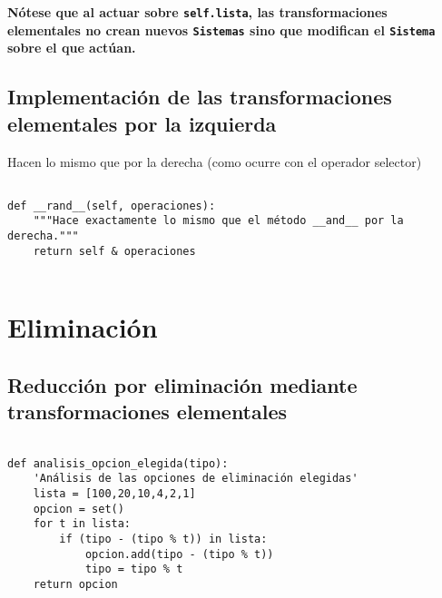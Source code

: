 \documentclass[11pt]{report}
\begin{document}
\textbf{Nótese que al actuar sobre \texttt{self.lista}, las transformaciones elementales no crean nuevos 
\texttt{Sistemas} sino que modifican el \texttt{Sistema} sobre el que actúan.}

\subsection{Implementación de las transformaciones elementales por la izquierda}
\label{sec:orgb33ea70}

Hacen lo mismo que por la derecha (como ocurre con el operador selector)

\begin{verbatim}
        
def __rand__(self, operaciones):
    """Hace exactamente lo mismo que el método __and__ por la derecha."""
    return self & operaciones
    
\end{verbatim}

\section{Eliminación}
\label{sec:orgd53c3b9}
\subsection{Reducción por eliminación mediante transformaciones elementales}
\label{sec:orgf2ab8b2}

\begin{verbatim}

def analisis_opcion_elegida(tipo):
    'Análisis de las opciones de eliminación elegidas'
    lista = [100,20,10,4,2,1]
    opcion = set()
    for t in lista:
        if (tipo - (tipo % t)) in lista:
            opcion.add(tipo - (tipo % t))
            tipo = tipo % t
    return opcion
    
\end{verbatim}
\end{document}
